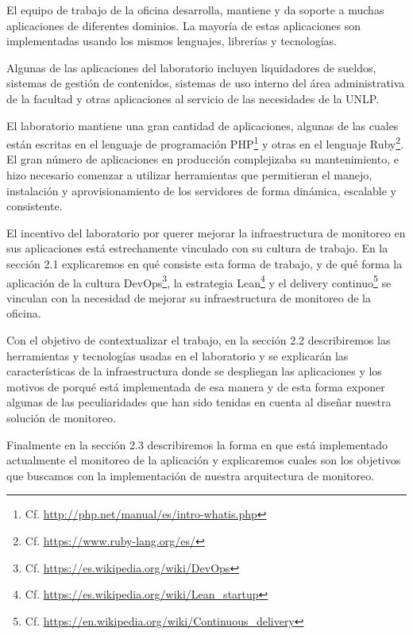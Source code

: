 El equipo de trabajo de la oficina desarrolla, mantiene y da soporte a muchas
aplicaciones de diferentes dominios. La mayoría de estas aplicaciones son
implementadas usando los mismos lenguajes, librerías y tecnologías.

Algunas de las aplicaciones del laboratorio incluyen liquidadores de sueldos,
sistemas de gestión de contenidos, sistemas de uso interno del área
administrativa de la facultad y otras aplicaciones al servicio de las
necesidades de la UNLP.

El laboratorio mantiene una gran cantidad de aplicaciones, algunas de las
cuales están escritas en el lenguaje de programación
PHP\footnote{Cf. \url{http://php.net/manual/es/intro-whatis.php}} y otras en el lenguaje
Ruby\footnote{Cf. \url{https://www.ruby-lang.org/es/}}. El gran número de aplicaciones en
producción complejizaba su mantenimiento, e hizo necesario comenzar a utilizar
herramientas que permitieran el manejo, instalación y aprovisionamiento de los
servidores de forma dinámica, escalable y consistente.

El incentivo del laboratorio por querer mejorar la infraestructura de monitoreo
en sus aplicaciones está estrechamente vinculado con su cultura de trabajo. En
la sección 2.1 explicaremos en qué consiste esta forma de trabajo, y de qué
forma la aplicación de la cultura
DevOps\footnote{Cf. \url{https://es.wikipedia.org/wiki/DevOps}}, la estrategia
Lean\footnote{Cf. \url{https://es.wikipedia.org/wiki/Lean_startup}} y el delivery
continuo\footnote{Cf. \url{https://en.wikipedia.org/wiki/Continuous_delivery}} se
vinculan con la necesidad de mejorar su infraestructura de monitoreo de la
oficina.

Con el objetivo de contextualizar el trabajo, en la sección 2.2 describiremos
las herramientas y tecnologías usadas en el laboratorio y se explicarán las
características de la infraestructura donde se despliegan las aplicaciones y
los motivos de porqué está implementada de esa manera y de esta forma exponer
algunas de las peculiaridades que han sido tenidas en cuenta al diseñar nuestra
solución de monitoreo.

Finalmente en la sección 2.3 describiremos la forma en que está implementado
actualmente el monitoreo de la aplicación y explicaremos cuales son los
objetivos que buscamos con la implementación de nuestra arquitectura de
monitoreo.
